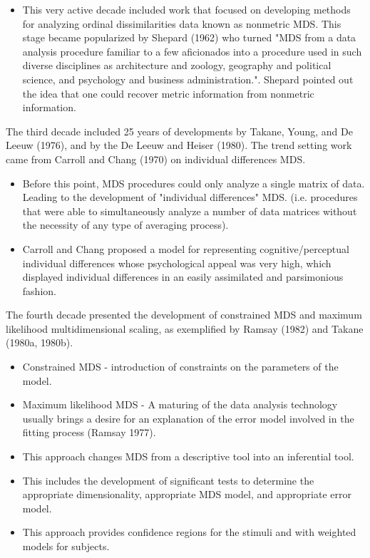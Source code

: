 \documentclass[11pt]{report}
\begin{document}
\begin{itemize}
\item This very active decade included work that focused on developing methods 
for analyzing ordinal dissimilarities data known as nonmetric MDS. This stage 
became popularized by Shepard (1962)\cite{Shepard1962} who turned "MDS from a 
data analysis procedure familiar to a few aficionados into a procedure used in 
such diverse disciplines as architecture and zoology, geography and political 
science, and psychology and business administration.". Shepard pointed out the 
idea that one could recover metric information from nonmetric information.
\end{itemize}

\indent The third decade included 25 years of developments by Takane, Young, 
and De Leeuw (1976)\cite{takane}, and by the De Leeuw and Heiser (1980)\cite{de_leeuw}. 
The trend setting work came from Carroll and Chang (1970)\cite{Carroll1970} on individual 
differences MDS. 

\begin{itemize}
\item Before this point, MDS procedures could only analyze a single matrix of 
data. Leading to the development of "individual differences"  MDS. (i.e. 
procedures that were able to simultaneously analyze a number of data matrices 
without the necessity of any type of averaging process). 

\item Carroll and Chang proposed a model for representing cognitive/perceptual 
individual differences whose psychological appeal was very high, which displayed 
individual differences in an easily assimilated and parsimonious fashion.
\end{itemize}

\indent  The fourth decade presented the development of constrained MDS and 
maximum likelihood multidimensional scaling, as exemplified by Ramsay (1982) and 
Takane (1980a, 1980b)\cite{takane}. 

\begin{itemize}
\item Constrained MDS - introduction of constraints on the parameters 
of the  model. 

\item Maximum likelihood MDS - A maturing of the data analysis technology 
usually brings a desire for an explanation of the error model involved in 
the fitting process (Ramsay 1977). 

\item This approach changes MDS from a descriptive tool into an inferential 
tool. 

\item This includes the development of significant tests to determine the 
appropriate dimensionality, appropriate MDS model, and appropriate 
error model. 

\item This approach provides confidence regions for the stimuli and with 
weighted models for subjects.         
\end{itemize}
\end{document}
